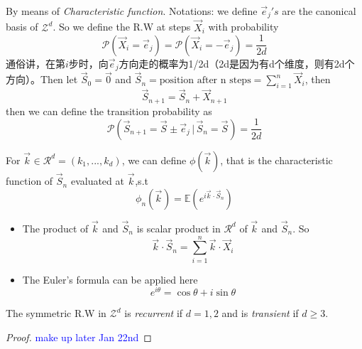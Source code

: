 \documentclass[10.5pt]{article}
\newcommand{\prob}[0]{\mathcal{P}}
\newcommand{\vect}[2]{\overrightarrow{#1}_{#2}}
\newenvironment{changemargin}[2]{%
  \begin{list}{}{%
    \setlength{\topsep}{0pt}%
    \setlength{\leftmargin}{#1}%
    \setlength{\rightmargin}{#2}%
    \setlength{\listparindent}{\parindent}%
    \setlength{\itemindent}{\parindent}%
    \setlength{\parsep}{\parskip}%
  }%
  \item[]}{\end{list}}
\begin{document}
\begin{changemargin}{-0.125in}{0in}
\begin{enumerate}
      By means of \textit{Characteristic function}. Notations: we define $\overrightarrow{e}_j's$ are the canonical basis of $\mathcal{Z}^d$. So we define the R.W at steps $\overrightarrow{X}_i$ with probability 
      \[
      \prob(\overrightarrow{X}_i = \overrightarrow{e}_j) =       \prob(\overrightarrow{X}_i = -\overrightarrow{e}_j) = \frac{1}{2d}
      \]
      通俗讲，在第$i$步时，向$\overrightarrow{e}_j$方向走的概率为1/2d（2d是因为有d个维度，则有2d个方向）。Then let $\overrightarrow{S}_0 = \overrightarrow{0}$ and $\overrightarrow{S}_n = \text{position after n steps} = \sum_{i=1}^n\overrightarrow{X}_i$, then 
      \[
      \overrightarrow{S}_{n+1} = \overrightarrow{S}_n + \overrightarrow{X}_{n+1}
      \]
      then we can define the transition probability as 
      \[
      \prob(\vect{S}{n+1} = \vect{S}{} \pm \vect{e}{j}\,|\,\vect{S}{n} = \vect{S}{}) = \frac{1}{2d}
      \]
      
      \begin{definition}
      	For $\vect{k}{} \in \mathcal{R}^d = (k_1, ..., k_d)$, we can define $\phi(\vect{k}{})$, that is the characteristic function of $\vect{S}{n}$ evaluated at $\vect{k}{}$,s.t
      	\[
      	\phi_n(\vect{k}{}) = \mathbb{E}(e^{i\vect{k}{} \cdot \vect{S}{n}})
      	\]
      \end{definition}
      
      \begin{remark}
      	\begin{itemize}
      		\item The product of $\vect{k}{}$ and $\vect{S}{n}$ is scalar product in $\mathcal{R}^d$ of $\vect{k}{}$ and $\vect{S}{n}$. So 
      		      \[
      		      \vect{k}{} \cdot \vect{S}{n} = \sum^n_{i=1}\vect{k}{}\cdot \vect{X}{i}
       		      \]
       		\item The Euler's formula can be applied here 
       		      \[
       		      e^{i\theta} = \cos\theta + i \sin\theta
       		      \]
      	\end{itemize}
      \end{remark}
      
      
      \begin{theorem}
      	The symmetric R.W in $\mathcal{Z}^d$ is \textit{recurrent} if $d = 1,2$ and is \textit{transient} if $d \geq 3$. 
      \end{theorem}
      
      \begin{proof}
      	\textcolor{blue}{make up later Jan 22nd}
      \end{proof}
      

\end{enumerate}
\end{changemargin}
\end{document}
